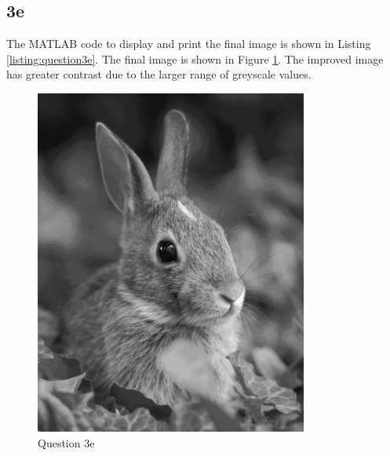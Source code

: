 \documentclass[12pt]{article}
\begin{document}
\subsection*{3e}
The MATLAB code to display and print the final image is shown in Listing \ref{listing:question3e}. The final image is shown in Figure \ref{fig:question3e}. The improved image has greater contrast due to the larger range of greyscale values. 

\begin{figure}[!ht]
    \centering
    \includegraphics[width=0.8\textwidth]{question3e.png}
    \caption{Question 3e}
    \label{fig:question3e}
\end{figure}
\end{document}
